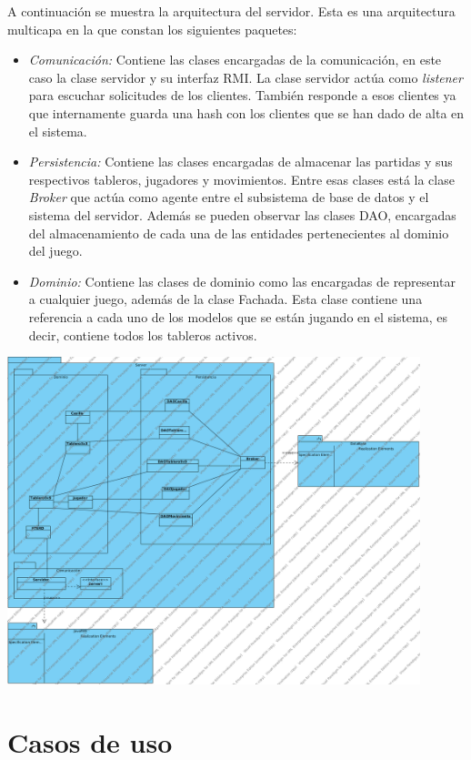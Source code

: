 \documentclass[a4paper,11pt,oneside]{article}
\begin{document}
A continuación se muestra la arquitectura del servidor. Esta es una arquitectura multicapa en la que constan los siguientes paquetes:
\begin{itemize}
\item \emph{Comunicación:} Contiene las clases encargadas de la comunicación, en este caso la clase servidor y su interfaz RMI. La clase servidor actúa como \emph{listener} para escuchar solicitudes de los clientes. También responde a esos clientes ya que internamente guarda una hash con los clientes que se han dado de alta en el sistema.
\item \emph{Persistencia:} Contiene las clases encargadas de almacenar las partidas y sus respectivos tableros, jugadores y movimientos. Entre esas clases está la clase \emph{Broker} que actúa como agente entre el subsistema de base de datos y el sistema del servidor. Además se pueden observar las clases DAO, encargadas del almacenamiento de cada una de las entidades pertenecientes al dominio del juego.
\item \emph{Dominio:} Contiene las clases de dominio como las encargadas de representar a cualquier juego, además de la clase Fachada. Esta clase contiene una referencia a cada uno de los modelos que se están jugando en el sistema, es decir, contiene todos los tableros activos.

\end{itemize}
\includegraphics[width=0.9\textwidth]{img/arq_Servidor.png}\\[1cm]
\section{Casos de uso}
\end{document}
